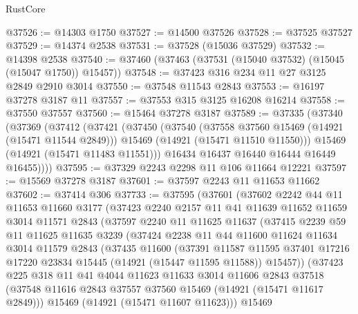 \begin{lexlean}{RustCore}
\begin{coremodule}
@37526 := @14303 @1750
@37527 := @14500 @37526
@37528 := @37525 @37527
@37529 := @14374 @2538
@37531 := @37528 (@15036 @37529)
@37532 := @14398 @2538
@37540 := @37460 (@37463 (@37531 (@15040 @37532) (@15045 (@15047 @1750)) @15457))
@37548 := @37423 @316 @234 @11 @27 @3125 @2849 @2910 @3014
@37550 := @37548 @11543 @2843
@37553 := @16197 @37278 @3187 @11
@37557 := @37553 @315 @3125 @16208 @16214
@37558 := @37550 @37557
@37560 := @15464 @37278 @3187
@37589 := @37335
    (@37340
      (@37369
        (@37412
          (@37421
            (@37450
              (@37540
                (@37558 @37560 @15469 (@14921 (@15471 @11544 @2849)))
                @15469
                (@14921 (@15471 @11510 @11550)))
              @15469
              (@14921 (@15471 @11483 @11551)))
            @16434
            @16437
            @16440
            @16444
            @16449
            @16455))))
@37595 := @37329 @2243 @2298 @11 @106 @11664 @12221
@37597 := @15569 @37278 @3187
@37601 := @37597 @2243 @11 @11653 @11662
@37602 := @37414 @306
@37733 := @37595
    (@37601
      (@37602
        @2242
        @44
        @11
        @11653
        @11660
        @3177
        (@37423
          @2240
          @2157
          @11
          @41
          @11639
          @11652
          @11659
          @3014
          @11571
          @2843
          (@37597
            @2240
            @11
            @11625
            @11637
            (@37415
              @2239
              @59
              @11
              @11625
              @11635
              @3239
              (@37424
                @2238
                @11
                @44
                @11600
                @11624
                @11634
                @3014
                @11579
                @2843
                (@37435
                  @11600
                  (@37391
                    @11587
                    @11595
                    @37401
                    @17216
                    @17220
                    @23834
                    @15445
                    (@14921 (@15447 @11595 @11588))
                    @15457))
                (@37423
                  @225
                  @318
                  @11
                  @41
                  @4044
                  @11623
                  @11633
                  @3014
                  @11606
                  @2843
                  @37518
                  (@37548 @11616 @2843 @37557 @37560 @15469 (@14921 (@15471 @11617 @2849)))
                  @15469
                  (@14921 (@15471 @11607 @11623)))
                @15469

\end{coremodule}
\end{lexlean}
